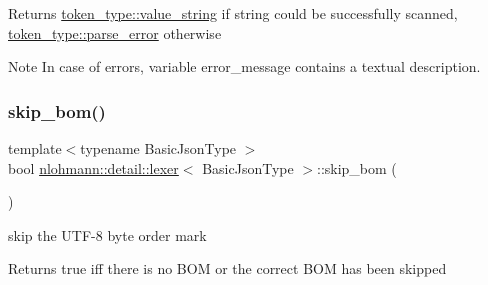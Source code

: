 \begin{DoxyReturn}{Returns}
\hyperlink{classnlohmann_1_1detail_1_1lexer_a3f313cdbe187cababfc5e06f0b69b098a2b490e8bf366b4cbe3ebd99b26ce15ce}{token\+\_\+type\+::value\+\_\+string} if string could be successfully scanned, \hyperlink{classnlohmann_1_1detail_1_1lexer_a3f313cdbe187cababfc5e06f0b69b098a456e19aeafa334241c7ff3f589547f9d}{token\+\_\+type\+::parse\+\_\+error} otherwise
\end{DoxyReturn}
\begin{DoxyNote}{Note}
In case of errors, variable error\+\_\+message contains a textual description. 
\end{DoxyNote}
\mbox{\label{classnlohmann_1_1detail_1_1lexer_a709afd52def2e258dac0b8a67dc4ea26}} 
\subsubsection{\texorpdfstring{skip\+\_\+bom()}{skip\_bom()}}
{\footnotesize\ttfamily template$<$typename Basic\+Json\+Type $>$ \\
bool \hyperlink{classnlohmann_1_1detail_1_1lexer}{nlohmann\+::detail\+::lexer}$<$ Basic\+Json\+Type $>$\+::skip\+\_\+bom (\begin{DoxyParamCaption}{ }\end{DoxyParamCaption})\hspace{0.3cm}{\ttfamily [inline]}}



skip the U\+T\+F-\/8 byte order mark 

\begin{DoxyReturn}{Returns}
true iff there is no B\+OM or the correct B\+OM has been skipped 
\end{DoxyReturn}
\mbox{\label{classnlohmann_1_1detail_1_1lexer_a1a2d4cc5d9fed4783aa2a98497925511}} 
